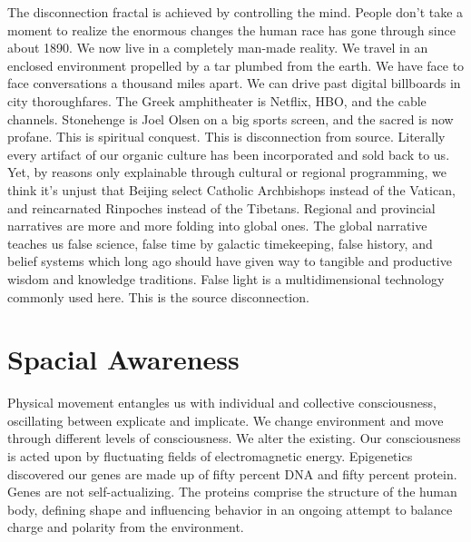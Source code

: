 \documentclass[letterpaper,9pt,twoside,titlepage,onecolumn,openany]{book}
\begin{document}
The disconnection fractal is achieved by controlling the mind. People
don't take a moment to realize the enormous changes the human race has
gone through since about 1890. We now live in a completely man-made
reality. We travel in an enclosed environment propelled by a tar plumbed
from the earth. We have face to face conversations a thousand miles
apart. We can drive past digital billboards in city thoroughfares. The
Greek amphitheater is Netflix, HBO, and the cable channels. Stonehenge
is Joel Olsen on a big sports screen, and the sacred is now profane.
This is spiritual conquest. This is disconnection from source. Literally
every artifact of our organic culture has been incorporated and sold
back to us. Yet, by reasons only explainable through cultural or
regional programming, we think it's unjust that Beijing select Catholic
Archbishops instead of the Vatican, and reincarnated Rinpoches instead
of the Tibetans. Regional and provincial narratives are more and more
folding into global ones. The global narrative teaches us false science,
false time by galactic timekeeping, false history, and belief systems
which long ago should have given way to tangible and productive wisdom
and knowledge traditions. False light is a multidimensional technology
commonly used here. This is the source disconnection.

\section*{Spacial Awareness}\label{spacial-awareness}

Physical movement entangles us with individual and collective
consciousness, oscillating between explicate and implicate. We change
environment and move through different levels of consciousness. We alter
the existing. Our consciousness is acted upon by fluctuating fields of
electromagnetic energy. Epigenetics discovered our genes are made up of
fifty percent DNA and fifty percent protein. Genes are not
self-actualizing. The proteins comprise the structure of the human body,
defining shape and influencing behavior in an ongoing attempt to balance
charge and polarity from the environment.
\end{document}

